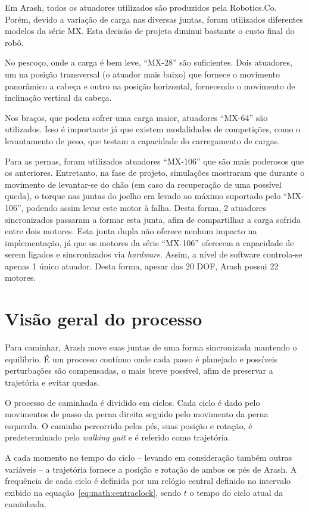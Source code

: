 Em Arash, todos os atuadores utilizados são produzidos pela Robotics.Co. Porém, devido a variação de carga nas diversas juntas, foram utilizados diferentes modelos da série MX. Esta decisão de projeto diminui bastante o custo final do robô.

No pescoço, onde a carga é bem leve, ``MX-28'' são suficientes. Dois atuadores, um na posição transversal (o atuador mais baixo) que fornece o movimento panorâmico a cabeça e outro na posição horizontal, fornecendo o movimento de inclinação vertical da cabeça.

Nos braços, que podem sofrer uma carga maior, atuadores ``MX-64'' são utilizados. Isso é importante já que existem modalidades de competições, como o levantamento de peso, que testam a capacidade do carregamento de cargas.

Para as pernas, foram utilizados atuadores ``MX-106'' que são mais poderosos que os anteriores. Entretanto, na fase de projeto, simulações mostraram que durante o movimento de levantar-se do chão (em caso da recuperação de uma possível queda), o torque nas juntas do joelho era levado ao máximo suportado pelo ``MX-106'', podendo assim levar este motor à falha. Desta forma, 2 atuadores sincronizados passaram a formar esta junta, afim de compartilhar a carga sofrida entre dois motores. Esta junta dupla não oferece nenhum impacto na implementação, já que os motores da série ``MX-106'' oferecem a capacidade de serem ligados e sincronizados via \textit{hardware}. Assim, a nível de software controla-se apenas 1 único atuador. Desta forma, apesar das 20 DOF, Arash possui 22 motores.

\section{Visão geral do processo}

Para caminhar, Arash move suas juntas de uma forma sincronizada mantendo o equilíbrio. É um processo contínuo onde cada passo é planejado e possíveis perturbações são compensadas, o mais breve possível, afim de preservar a trajetória e evitar quedas.

O processo de caminhada é dividido em ciclos. Cada ciclo é dado pelo movimentos de passo da perna direita seguido pelo movimento da perna esquerda. O caminho percorrido pelos pés, suas posição e rotação, é predeterminado pelo \textit{walking gait} e é referido como trajetória.

A cada momento no tempo do ciclo -- levando em consideração também outras variáveis -- a trajetória fornece a posição e rotação de ambos os pés de Arash. A frequência de cada ciclo é definida por um relógio central definido no intervalo exibido na equação~\ref{eq:math:centraclock}, sendo $t$ o tempo do ciclo atual da caminhada.

